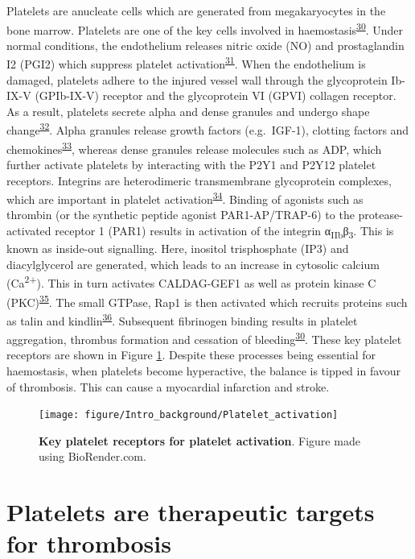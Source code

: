 \documentclass[11pt,twoside]{bristolthesis}
\begin{document}
Platelets are anucleate cells which are generated from megakaryocytes in the bone marrow. Platelets are one of the key cells involved in haemostasis\textsuperscript{\protect\hyperlink{ref-Rivera2009}{30}}. Under normal conditions, the endothelium releases nitric oxide (NO) and prostaglandin I2 (PGI2) which suppress platelet activation\textsuperscript{\protect\hyperlink{ref-Yau2015}{31}}. When the endothelium is damaged, platelets adhere to the injured vessel wall through the glycoprotein Ib-IX-V (GPIb-IX-V) receptor and the glycoprotein VI (GPVI) collagen receptor. As a result, platelets secrete alpha and dense granules and undergo shape change\textsuperscript{\protect\hyperlink{ref-Badimon2012}{32}}. Alpha granules release growth factors (e.g.~IGF-1), clotting factors and chemokines\textsuperscript{\protect\hyperlink{ref-Gear2003}{33}}, whereas dense granules release molecules such as ADP, which further activate platelets by interacting with the P2Y1 and P2Y12 platelet receptors. Integrins are heterodimeric transmembrane glycoprotein complexes, which are important in platelet activation\textsuperscript{\protect\hyperlink{ref-Durrant2017a}{34}}. Binding of agonists such as thrombin (or the synthetic peptide agonist PAR1-AP/TRAP-6) to the protease-activated receptor 1 (PAR1) results in activation of the integrin α\textsubscript{IIb}β\textsubscript{3}. This is known as inside-out signalling. Here, inositol trisphosphate (IP3) and diacylglycerol are generated, which leads to an increase in cytosolic calcium (Ca\textsuperscript{2+}). This in turn activates CALDAG-GEF1 as well as protein kinase C (PKC)\textsuperscript{\protect\hyperlink{ref-Mehrbod2013}{35}}. The small GTPase, Rap1 is then activated which recruits proteins such as talin and kindlin\textsuperscript{\protect\hyperlink{ref-Durrant2017}{36}}. Subsequent fibrinogen binding results in platelet aggregation, thrombus formation and cessation of bleeding\textsuperscript{\protect\hyperlink{ref-Rivera2009}{30}}. These key platelet receptors are shown in Figure \ref{fig:platelet-activation-receptors}. Despite these processes being essential for haemostasis, when platelets become hyperactive, the balance is tipped in favour of thrombosis. This can cause a myocardial infarction and stroke.



\begin{figure}
\texttt{[image: figure/Intro\_background/Platelet\_activation]} \caption[Key platelet receptors for platelet activation]{\textbf{Key platelet receptors for platelet activation}. Figure made using BioRender.com.}\label{fig:platelet-activation-receptors}
\end{figure}
\hypertarget{platelets-are-therapeutic-targets-for-thrombosis}{%
\section{Platelets are therapeutic targets for thrombosis}\label{platelets-are-therapeutic-targets-for-thrombosis}}
\end{document}
